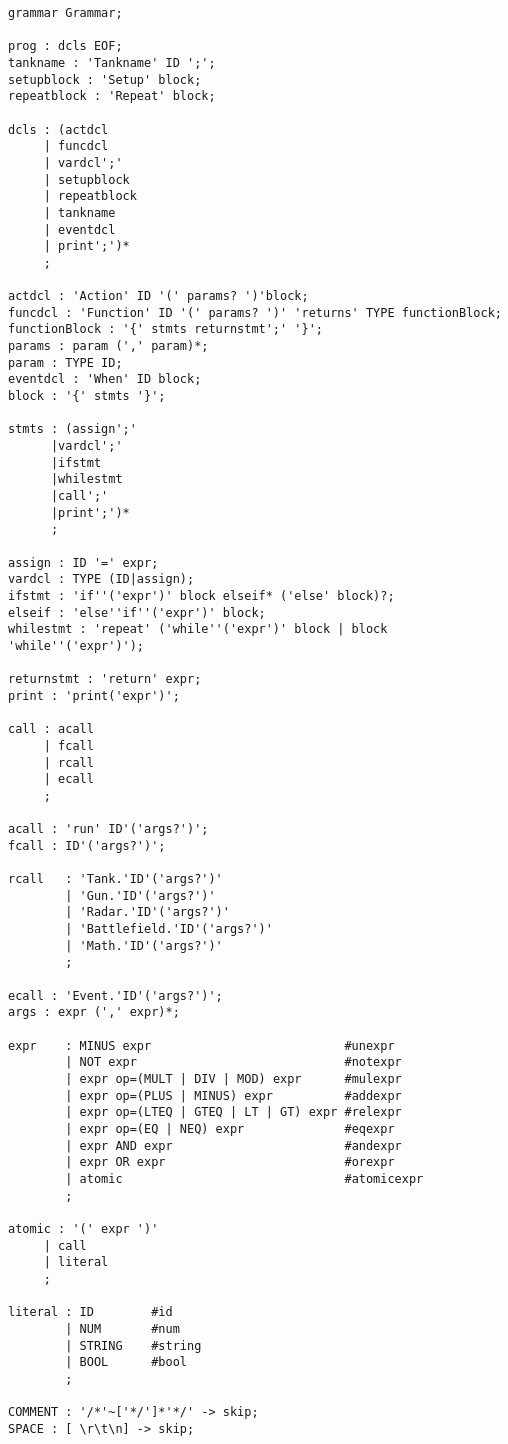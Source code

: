 \begin{lstlisting}[label={lst:CFG}]
grammar Grammar;

prog : dcls EOF;
tankname : 'Tankname' ID ';';
setupblock : 'Setup' block;
repeatblock : 'Repeat' block;

dcls : (actdcl
     | funcdcl
     | vardcl';'
     | setupblock
     | repeatblock
     | tankname
     | eventdcl
     | print';')*
     ;

actdcl : 'Action' ID '(' params? ')'block;
funcdcl : 'Function' ID '(' params? ')' 'returns' TYPE functionBlock;
functionBlock : '{' stmts returnstmt';' '}';
params : param (',' param)*;
param : TYPE ID;
eventdcl : 'When' ID block;
block : '{' stmts '}';

stmts : (assign';'
      |vardcl';'
      |ifstmt
      |whilestmt
      |call';'
      |print';')*
      ;

assign : ID '=' expr;
vardcl : TYPE (ID|assign);
ifstmt : 'if''('expr')' block elseif* ('else' block)?;
elseif : 'else''if''('expr')' block;
whilestmt : 'repeat' ('while''('expr')' block | block 'while''('expr')');

returnstmt : 'return' expr;
print : 'print('expr')';

call : acall
     | fcall
     | rcall
     | ecall
     ;

acall : 'run' ID'('args?')';
fcall : ID'('args?')';

rcall   : 'Tank.'ID'('args?')'
        | 'Gun.'ID'('args?')'
        | 'Radar.'ID'('args?')'
        | 'Battlefield.'ID'('args?')'
        | 'Math.'ID'('args?')'
        ;

ecall : 'Event.'ID'('args?')';
args : expr (',' expr)*;

expr    : MINUS expr                           #unexpr
        | NOT expr                             #notexpr
        | expr op=(MULT | DIV | MOD) expr      #mulexpr
        | expr op=(PLUS | MINUS) expr          #addexpr
        | expr op=(LTEQ | GTEQ | LT | GT) expr #relexpr
        | expr op=(EQ | NEQ) expr              #eqexpr
        | expr AND expr                        #andexpr
        | expr OR expr                         #orexpr
        | atomic                               #atomicexpr
        ;

atomic : '(' expr ')'
     | call
     | literal
     ;

literal : ID        #id
        | NUM       #num
        | STRING    #string
        | BOOL      #bool
        ;

COMMENT : '/*'~['*/']*'*/' -> skip;
SPACE : [ \r\t\n] -> skip;

\end{lstlisting}


